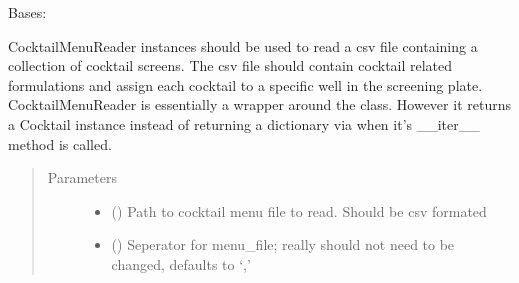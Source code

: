 \documentclass[letterpaper,10pt,english]{sphinxmanual}
\begin{document}

\begin{fulllineitems}
\label{\detokenize{polo.utils:polo.utils.io_utils.CocktailMenuReader}}
Bases: 

CocktailMenuReader instances should be used to read a csv file containing
a collection of cocktail screens. The csv file should contain cocktail
related formulations and assign each cocktail to a specific well in the
screening plate. CocktailMenuReader is essentially a wrapper around 
the  class. However it returns a Cocktail instance 
instead of returning a dictionary via when it’s \_\_iter\_\_ method is called.

\begin{sphinxVerbatim}[commandchars=\\\{\}]
  
  
  
\end{sphinxVerbatim}
\begin{quote}\begin{description}
\item[{Parameters}] \leavevmode\begin{itemize}
\item {} 
 () \textendash{} Path to cocktail menu file to read. Should be csv
formated

\item {} 
 (\sphinxstyleliteralemphasis{\sphinxupquote{, }}) \textendash{} Seperator for menu\_file; really should not need to 
be changed, defaults to ‘,’


\end{itemize}
\end{description}
\end{quote}
\end{fulllineitems}
\end{document}
